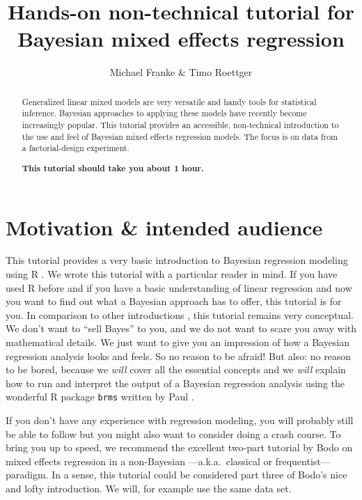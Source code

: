 \documentclass[nobib]{tufte-handout}
\title{Hands-on non-technical tutorial for Bayesian mixed effects regression}
\author{Michael Franke \& Timo Roettger}
\date{}
\begin{document}
\maketitle

\begin{abstract}
  \noindent Generalized linear mixed models are very versatile and handy tools for statistical inference. Bayesian approaches to applying these models have recently become increasingly popular. This tutorial provides an accessible, non-technical introduction to the use and feel of Bayesian mixed effects regression models. The focus is on data from a factorial-design experiment. \\
  
  \medskip
  
  \noindent \textbf{This tutorial should take you about 1 hour.}
\end{abstract}

\section{Motivation \& intended audience}

This tutorial provides a very basic introduction to Bayesian regression modeling using R \citep{Manual}. We wrote this tutorial with a particular reader in mind. If you have used R before and if you have a basic understanding of linear regression and now you want to find out what a Bayesian approach has to offer, this tutorial is for you. In comparison to other introductions \citep[e.g.][]{SorensenHohensteinb2016:Bayesian-linear}, this tutorial remains very conceptual. We don’t want to ``sell Bayes'' to you, and we do not want to scare you away with mathematical details. We just want to give you an impression of how a Bayesian regression analysis looks and feels. So no reason to be afraid! But also: no reason to be bored, because we \emph{will} cover all the essential concepts and we \emph{will} explain how to run and interpret the output of a Bayesian regression analysis using the wonderful R package \texttt{brms} written by Paul \citet{buerkner2016brms}.

If you don’t have any experience with regression modeling, you will probably still be able to follow but you might also want to consider doing a crash course. To bring you up to speed, we recommend the excellent two-part tutorial by Bodo \citet{Winter2013:Linear-models-a} on mixed effects regression in a non-Bayesian ---a.k.a.~classical or frequentist--- paradigm. In a sense, this tutorial could be considered part three of Bodo's nice and lofty introduction. We will, for example use the same data set.
\end{document}
